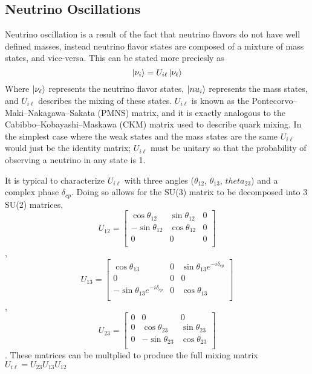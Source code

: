 \subsection{Neutrino Oscillations}
Neutrino oscillation is a result of the fact that neutrino flavors do not have
well defined masses, instead neutrino flavor states are composed of a mixture
of mass states, and vice-versa.
This can be stated more preciesly as
\begin{equation}
    \ket{\nu_{i}} = U_{i\ell}\ket{\nu_\ell}
\end{equation}
Where $\ket{\nu_\ell}$ represents the neutrino flavor states, $\ket{nu_i}$
represents the mass states, and $U_{i\ell}$ describes the mixing of these
states. $U_{i\ell}$ is known as the Pontecorvo–Maki–Nakagawa–Sakata (PMNS) matrix,
and it is exactly analogous to the Cabibbo–Kobayashi–Maskawa (CKM) matrix used
to describe quark mixing.
In the simplest case where the weak states and the mass states are the same
$U_{i\ell}$ would just be the identity matrix;
$U_{i\ell}$ must be unitary so that the probability of observing
a neutrino in any state is 1.

It is typical to characterize $U_{i\ell}$ with three angles
($\theta_{12}$, $\theta_{13}$, $theta_{23}$) and a complex
phase $\delta_{cp}$. Doing so allows for the SU(3) matrix to
be decomposed into 3 SU(2) matrices,
$$U_{12} =
\begin{bmatrix}
    \cos\theta_{12} & \sin\theta_{12} & 0  \\
    -\sin\theta_{12}& \cos\theta_{12} & 0  \\
    0 & 0 & 0  \\
\end{bmatrix}
$$,
$$
U_{13} =
\begin{bmatrix}
    \cos\theta_{13} & 0 & \sin\theta_{13}e^{-i\delta_{cp}}\\
    0 & 0 & 0  \\
    -\sin\theta_{13} e^{-i\delta_{cp}} & 0 & \cos\theta_{13}  \\
\end{bmatrix}
$$,
$$
U_{23} =
\begin{bmatrix}
    0 & 0 & 0  \\
    0 & \cos\theta_{23} & \sin\theta_{23} \\
    0 & -\sin\theta_{23} & \cos\theta_{23}   \\
\end{bmatrix}
$$.
These matrices can be multplied to produce the full mixing matrix
$U_{i\ell} = U_{23}U_{13}U_{12}$

